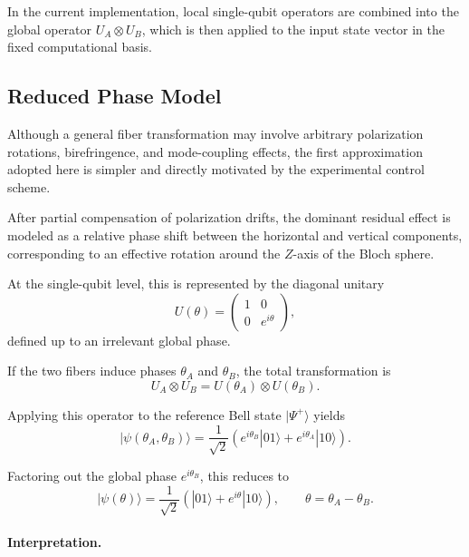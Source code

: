 \documentclass[a4paper]{article}
\begin{document}
In the current implementation, local single-qubit operators are combined into the global operator \( U_A \otimes U_B \), which is then applied to the input state vector in the fixed computational basis.


\subsection{Reduced Phase Model}

Although a general fiber transformation may involve arbitrary polarization rotations, birefringence, and mode-coupling effects, the first approximation adopted here is simpler and directly motivated by the experimental control scheme.

After partial compensation of polarization drifts, the dominant residual effect is modeled as a relative phase shift between the horizontal and vertical components, corresponding to an effective rotation around the \(Z\)-axis of the Bloch sphere.

\medskip

At the single-qubit level, this is represented by the diagonal unitary
\[
U(\theta)
=
\begin{pmatrix}
1 & 0\\
0 & e^{i\theta}
\end{pmatrix},
\]
defined up to an irrelevant global phase.

If the two fibers induce phases \( \theta_A \) and \( \theta_B \), the total transformation is
\[
U_A \otimes U_B
=
U(\theta_A) \otimes U(\theta_B).
\]

\medskip

Applying this operator to the reference Bell state \( |\Psi^+\rangle \) yields
\[
|\psi(\theta_A,\theta_B)\rangle
=
\frac{1}{\sqrt{2}}
\left(
e^{i\theta_B}|01\rangle
+
e^{i\theta_A}|10\rangle
\right).
\]

Factoring out the global phase \( e^{i\theta_B} \), this reduces to
\[
|\psi(\theta)\rangle
=
\frac{1}{\sqrt{2}}
\left(
|01\rangle
+
e^{i\theta}|10\rangle
\right),
\qquad
\theta = \theta_A - \theta_B.
\]

\medskip

\paragraph{Interpretation.}
\end{document}
